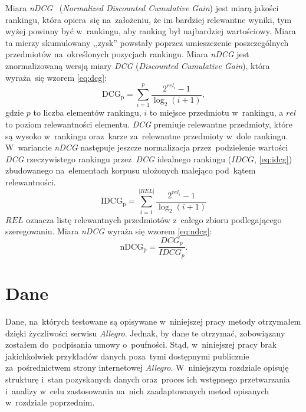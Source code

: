 \documentclass[pl]{minipw} %
\begin{document}
Miara \textit{nDCG}~\cite{ndcg} (\textit{Normalized Discounted Cumulative Gain}) jest miarą jakości rankingu, która opiera~się na~założeniu, że im bardziej relewantne wyniki, tym wyżej powinny być w~rankingu, aby ranking był najbardziej wartościowy. Miara ta mierzy skumulowany ,,zysk'' powstały poprzez umieszczenie poszczególnych przedmiotów na~określonych pozycjach rankingu. Miara \textit{nDCG} jest znormalizowaną wersją miary \textit{DCG} (\textit{Discounted Cumulative Gain}), która wyraża~się wzorem \ref{eq:dcg}: 
\begin{equation}
\label{eq:dcg}
{\mathrm  {DCG_{{p}}}}=\sum _{{i=1}}^{{p}}{\frac  {2^{{rel_{{i}}}}-1}{\log _{{2}}(i+1)}},
\end{equation}
gdzie $p$ to liczba elementów rankingu, $i$ to miejsce przedmiotu w~rankingu, a $rel$ to poziom relewantności elementu. \textit{DCG} premiuje relewantne przedmioty, które są wysoko w~rankingu oraz~karze za~relewantne przedmioty w~dole rankingu. W~wariancie \textit{nDCG} następuje jeszcze normalizacja przez~podzielenie wartości \textit{DCG} rzeczywistego rankingu przez~\textit{DCG} idealnego rankingu ($IDCG$, \ref{eq:idcg}) zbudowanego na~elementach korpusu ułożonych malejąco pod~kątem relewantności.
\begin{equation}
\label{eq:idcg}
\mathrm {IDCG_{p}} =\sum _{i=1}^{|REL|}{\frac {2^{rel_{i}}-1}{\log _{2}(i+1)}}
\end{equation}
$REL$ oznacza listę relewantnych przedmiotów z~całego zbioru podlegającego szeregowaniu. Miara \textit{nDCG} wyraża się wzorem \ref{eq:ndcg}:
\begin{equation}
\label{eq:ndcg}
{\mathrm  {nDCG_{{p}}}}={\frac  {DCG_{{p}}}{IDCG_{{p}}}}.
\end{equation}


\chapter{Dane}

Dane, na~których testowane są opisywane w~niniejszej pracy metody otrzymałem dzięki życzliwości serwisu \textit{Allegro}. Jednak, by dane te otrzymać, zobowiązany zostałem do~podpisania umowy o~poufności. Stąd, w~niniejszej pracy brak jakichkolwiek przykładów danych poza~tymi dostępnymi publicznie za~pośrednictwem strony internetowej \textit{Allegro}. W~niniejszym rozdziale opisuję strukturę i~stan pozyskanych danych oraz~proces ich wstępnego przetwarzania i~analizy w~celu zastosowania na~nich zaadaptowanych metod opisanych w~rozdziale poprzednim. 
\end{document}
